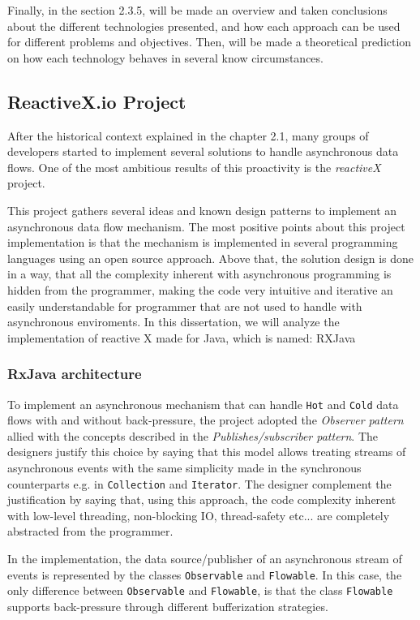 Finally, in the section 2.3.5, will be made an overview and taken conclusions about the different technologies presented, and how each approach can be used for different problems and objectives. Then, will be made a theoretical prediction on how each technology behaves in several know circumstances. 

\subsection{ReactiveX.io Project}
\label{reactivex}

After the historical context explained in the chapter 2.1, many groups of developers started to implement several solutions to handle asynchronous data flows. One of the most ambitious results of this proactivity is the \textit{reactiveX} project.

This project gathers several ideas and known design patterns to implement an asynchronous data flow mechanism. 
The most positive points about this project implementation is that the mechanism is implemented in several programming languages using an open source approach. Above that, the solution design is done in a way, that all the complexity inherent with asynchronous programming is hidden from the programmer, making the code very intuitive and iterative an easily understandable for programmer that are not used to handle with asynchronous enviroments. 
In this dissertation, we will analyze the implementation of reactive X made for Java, which is named: RXJava
\clearpage
\subsubsection{RxJava architecture}
\label{rxjava}
To implement an asynchronous mechanism that can handle \texttt{Hot} and \texttt{Cold} data flows with and without back-pressure, the project adopted the \textit{Observer pattern} allied with the concepts described in the \textit{Publishes/subscriber pattern}.
The designers justify this choice by saying that this model allows treating streams of asynchronous events with the same simplicity made in the synchronous counterparts e.g. in \texttt{Collection} and \texttt{Iterator}. The designer complement the justification by saying that, using this approach, the code complexity inherent with low-level threading, non-blocking IO, thread-safety etc... are completely abstracted from the programmer.

In the implementation, the data source/publisher of an asynchronous stream of events is represented by the classes \texttt{Observable} and \texttt{Flowable}. In this case, the only difference between \texttt{Observable} and \texttt{Flowable}, is that the class \texttt{Flowable} supports back-pressure through different bufferization strategies.

